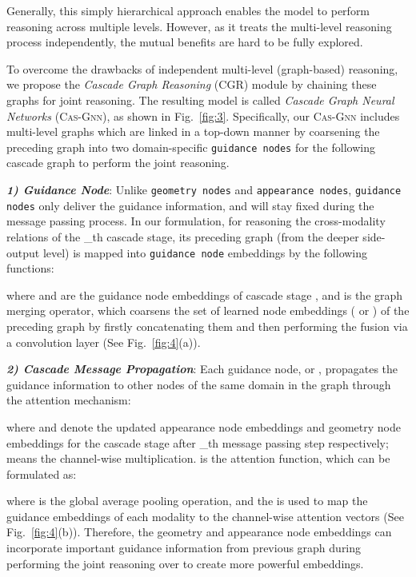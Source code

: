 \documentclass[runningheads]{llncs}
\begin{document}
Generally, this simply hierarchical approach enables the model to perform reasoning across multiple levels. However, as it treats the multi-level reasoning process independently, the mutual benefits are hard to be fully explored. 

To overcome the drawbacks of independent multi-level (graph-based) reasoning, we propose the {\em Cascade Graph Reasoning} (CGR) module by chaining these graphs  for joint reasoning. The resulting model is called {\em Cascade Graph Neural Networks} ({\scshape{Cas-Gnn}}), as shown in Fig.~\ref{fig:3}. Specifically, our {\scshape{Cas-Gnn}} includes multi-level graphs  which are linked in a top-down manner by coarsening the preceding graph into two domain-specific {\tt guidance nodes} for the following cascade graph to perform the joint reasoning.

\noindent \emph{\textbf{\footnotesize 1) Guidance Node}}: Unlike {\tt geometry nodes} and  {\tt appearance nodes}, {\tt guidance nodes} only deliver the guidance information, and will stay fixed during the message passing process. In our formulation, for reasoning the cross-modality relations of the \_th cascade stage, its preceding graph (from the deeper side-output level) is mapped into {\tt guidance node} embeddings by the following functions:


\noindent where	 and  are the guidance node embeddings of cascade stage , and  is the graph merging operator, which coarsens the set of learned node embeddings ( or ) of the preceding graph  by firstly concatenating them and then performing the fusion via a  convolution layer (See Fig.~\ref{fig:4}(a)). 




\noindent \emph{\textbf{\footnotesize 2) Cascade Message Propagation}}: Each guidance node,   or , propagates the guidance information to other nodes of the same domain in the graph  through the attention mechanism:


\noindent where  and  denote the updated appearance node embeddings and geometry node embeddings for the cascade stage  after \_th message passing step respectively;  means the channel-wise multiplication.  is the attention function, which can be formulated as:


\noindent where  is the global average pooling operation, and the  is used to map the guidance embeddings of each modality to the channel-wise attention vectors (See Fig.~\ref{fig:4}(b)). Therefore, the geometry and appearance node embeddings can incorporate important guidance information from previous graph  during performing the joint reasoning over  to create more powerful embeddings. 
\end{document}
